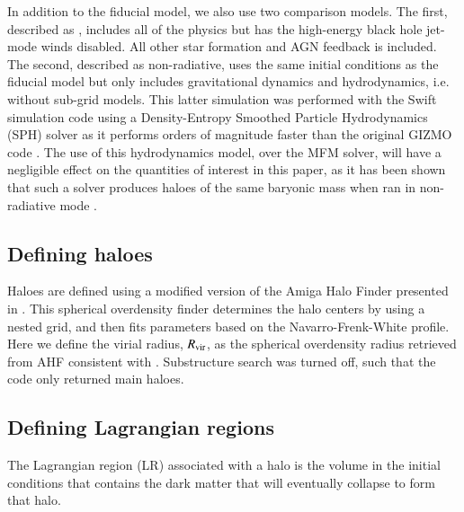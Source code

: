 In addition to the fiducial model, we also use two comparison models. The
first, described as \nojet{}, includes all of the \simba{} physics but has
the high-energy black hole jet-mode winds disabled. All other star formation
and AGN feedback is included. The second, described as non-radiative, uses
the same initial conditions as the fiducial model but only includes
gravitational dynamics and hydrodynamics, i.e. without sub-grid models. This
latter simulation was performed with the {\sc Swift} simulation code
\citep{Schaller2016} using a Density-Entropy Smoothed Particle Hydrodynamics
(SPH) solver as it performs orders of magnitude faster than the original
GIZMO code \citep{Borrow2018}. The use of this hydrodynamics model, over the
MFM solver, will have a negligible effect on the quantities of interest in
this paper, as it has been shown that such a solver produces haloes of the
same baryonic mass when ran in non-radiative mode \citep[see
e.g.][]{Sembolini2016}.

\subsection{Defining haloes}

Haloes are defined using a modified version of the Amiga Halo Finder
\citep[AHF, ][]{Gill2004, Knollmann2009} presented in \citet{Muratov2015}.
This spherical overdensity finder determines the halo centers by using a
nested grid, and then fits parameters based on the Navarro-Frenk-White
\citep[NFW, ][]{Navarro1995} profile. Here we define the virial radius,
$R_{\rm vir}$, as the spherical overdensity radius retrieved from AHF consistent
with \citet{Bryan1998}. Substructure search was turned off, such that the
code only returned main haloes.

\subsection{Defining Lagrangian regions}

The Lagrangian region (LR) associated with a halo is the volume in the initial conditions
that contains the dark matter that will eventually collapse to form that halo.

